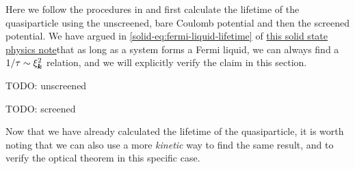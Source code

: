 \documentclass[hyperref, a4paper]{article}
\newcommand{\soliddoc}{\href{../solid/solid.pdf}{this solid state physics note}}
\begin{document}
Here we follow the procedures in \cite{dupuis} and first calculate the lifetime of the quasiparticle
using the unscreened, bare Coulomb potential and then the screened potential. We have argued in 
\eqref{solid-eq:fermi-liquid-lifetime} of \soliddoc that as long as a system forms a Fermi liquid, 
we can always find a $1 / \tau \sim \xi_{\vb*{k}}^2$ relation, and we will explicitly verify the claim 
in this section.

TODO: unscreened 

TODO: screened 

Now that we have already calculated the lifetime of the quasiparticle, it is worth noting that we can 
also use a more \emph{kinetic} way to find the same result, and to verify the optical theorem in this  
specific case. 



\end{document}
